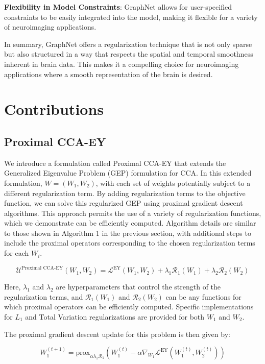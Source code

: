 \textbf{Flexibility in Model Constraints}: GraphNet allows for user-specified constraints to be easily integrated into the model, making it flexible for a variety of neuroimaging applications.

In summary, GraphNet offers a regularization technique that is not only sparse but also structured in a way that respects the spatial and temporal smoothness inherent in brain data.
This makes it a compelling choice for neuroimaging applications where a smooth representation of the brain is desired.


\section{Contributions}
\subsection{Proximal CCA-EY}
We introduce a formulation called Proximal CCA-EY that extends the Generalized Eigenvalue Problem (GEP) formulation for CCA. In this extended formulation, \( W = (W_1, W_2) \), with each set of weights potentially subject to a different regularization term.
By adding regularization terms to the objective function, we can solve this regularized GEP using proximal gradient descent algorithms.
This approach permits the use of a variety of regularization functions, which we demonstrate can be efficiently computed.
Algorithm details are similar to those shown in Algorithm 1 in the previous section, with additional steps to include the proximal operators corresponding to the chosen regularization terms for each \( W_i \).

\begin{equation}
\label{eq:proximal-CCA-EY}
    \mathcal{U}^{\text{Proximal CCA-EY}}(W_1, W_2) = \mathcal{L}^{\text{EY}}(W_1, W_2) + \lambda_1 \mathcal{R}_1(W_1) + \lambda_2 \mathcal{R}_2(W_2)
\end{equation}

Here, \( \lambda_1 \) and \( \lambda_2 \) are hyperparameters that control the strength of the regularization terms, and \( \mathcal{R}_1(W_1) \) and \( \mathcal{R}_2(W_2) \) can be any functions for which proximal operators can be efficiently computed.
Specific implementations for \( L_1 \) and Total Variation regularizations are provided for both \( W_1 \) and \( W_2 \).

The proximal gradient descent update for this problem is then given by:

\begin{equation}
\label{eq:proximal-update}
    W_1^{(t+1)} = \text{prox}_{\alpha \lambda_1 \mathcal{R}_1}\left( W_1^{(t)} - \alpha \nabla_{W_1} \mathcal{L}^{\text{EY}}(W_1^{(t)}, W_2^{(t)}) \right)
\end{equation}

